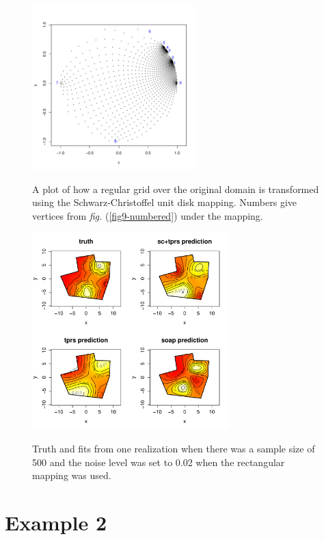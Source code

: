 \documentclass[a4paper,10pt]{amsart}
\newcommand{\sch}{Schwarz-Christoffel }
\newcommand{\fig}[1]{\emph{fig.} (\ref{#1})}
\begin{document}
\begin{figure}[tbp]
\centering
\includegraphics[width=2.5in]{figs-otherdomains/fig9-pointplot-disk.pdf} \\
\caption{A plot of how a regular grid over the original domain is transformed using the \sch unit disk mapping. Numbers give vertices from \fig{fig9-numbered} under the mapping.}
\label{fig9-disk-bunching}
\end{figure}


\begin{figure}[tbp]
\centering
\includegraphics[width=3in]{figs-otherdomains/fig9-rect-real.pdf} \\
\caption{Truth and fits from one realization when there was a sample size of 500 and the noise level was set to 0.02 when the rectangular mapping was used. }
\label{fig9-rect-real}
\end{figure}




\section{Example 2}
\end{document}
